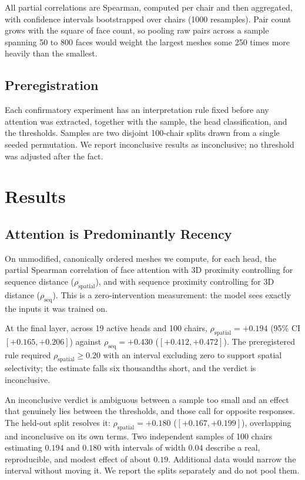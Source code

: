 \documentclass[conference]{IEEEtran}
\begin{document}
All partial correlations are Spearman, computed per chair and then aggregated,
with confidence intervals bootstrapped over chairs (1000 resamples). Pair count
grows with the square of face count, so pooling raw pairs across a sample
spanning 50 to 800 faces would weight the largest meshes some 250 times more
heavily than the smallest.

\subsection{Preregistration}

Each confirmatory experiment has an interpretation rule fixed before any
attention was extracted, together with the sample, the head classification, and
the thresholds. Samples are two disjoint 100-chair splits drawn from a single
seeded permutation. We report inconclusive results as inconclusive; no threshold
was adjusted after the fact.

\section{Results}

\subsection{Attention is Predominantly Recency}
\label{sec:e1}

On unmodified, canonically ordered meshes we compute, for each head, the partial
Spearman correlation of face attention with 3D proximity controlling for sequence
distance ($\rho_{\text{spatial}}$), and with sequence proximity controlling for 3D
distance ($\rho_{\text{seq}}$). This is a zero-intervention measurement: the model
sees exactly the inputs it was trained on.

At the final layer, across 19 active heads and 100 chairs,
$\rho_{\text{spatial}} = +0.194$ (95\% CI $[+0.165, +0.206]$) against
$\rho_{\text{seq}} = +0.430$ ($[+0.412, +0.472]$). The preregistered rule required
$\rho_{\text{spatial}} \geq 0.20$ with an interval excluding zero to support
spatial selectivity; the estimate falls six thousandths short, and the verdict is
inconclusive.

An inconclusive verdict is ambiguous between a sample too small and an effect that
genuinely lies between the thresholds, and those call for opposite responses. The
held-out split resolves it: $\rho_{\text{spatial}} = +0.180$ ($[+0.167, +0.199]$),
overlapping and inconclusive on its own terms. Two independent samples of 100
chairs estimating $0.194$ and $0.180$ with intervals of width $0.04$ describe a
real, reproducible, and modest effect of about $0.19$. Additional data would
narrow the interval without moving it. We report the splits separately and do not
pool them.
\end{document}

